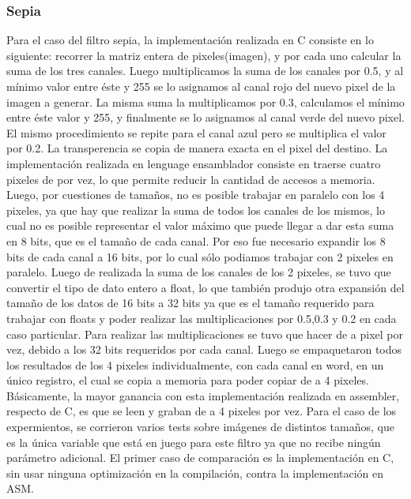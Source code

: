 \documentclass[a4paper]{article}
\begin{document}
\subsubsection{Sepia}
Para el caso del filtro sepia, la implementación realizada en C consiste en lo siguiente: recorrer la matriz entera de pixeles(imagen), y por cada uno calcular la suma de los tres canales. Luego multiplicamos la suma de los canales por 0.5, y al mínimo valor entre éste y 255 se lo asignamos al canal rojo del nuevo pixel de la imagen a generar. La misma suma la multiplicamos por 0.3, calculamos el mínimo entre éste valor y 255, y finalmente se lo asignamos al canal verde del nuevo pixel. El mismo procedimiento se repite para el canal azul pero se multiplica el valor por 0.2. La transperencia se copia de manera exacta en el pixel del destino. La implementación realizada en lenguage ensamblador consiste en traerse cuatro pixeles de por vez, lo que permite reducir la cantidad de accesos a memoria. Luego, por cuestiones de tamaños, no es posible trabajar en paralelo con los 4 pixeles, ya que hay que realizar la suma de todos los canales de los mismos, lo cual no es posible representar el valor máximo que puede llegar a dar esta suma en 8 bits, que es el tamaño de cada canal. Por eso fue necesario expandir los 8 bits de cada canal a 16 bits, por lo cual sólo podiamos trabajar con 2 pixeles en paralelo. Luego de realizada la suma de los canales de los 2 pixeles, se tuvo que convertir el tipo de dato entero a float, lo que también produjo otra expansión del tamaño de los datos de 16 bits a 32 bits ya que es el tamaño requerido para trabajar con floats y poder realizar las multiplicaciones por 0.5,0.3 y 0.2 en cada caso particular. Para realizar las multiplicaciones se tuvo que hacer de a pixel por vez, debido a los 32 bits requeridos por cada canal. Luego se empaquetaron todos los resultados de los 4 pixeles individualmente, con cada canal en word, en un único registro, el cual se copia a memoria para poder copiar de a 4 pixeles. Básicamente, la mayor ganancia con esta implementación realizada en assembler, respecto de C, es que se leen y graban de a 4 pixeles por vez. 
\newline
Para el caso de los expermientos, se corrieron varios tests sobre imágenes de distintos tamaños, que es la única variable que está en juego para este filtro ya que no recibe ningún parámetro adicional.
\newline
El primer caso de comparación es la implementación en C, sin usar ninguna optimización en la compilación, contra la implementación en ASM.
\end{document}
